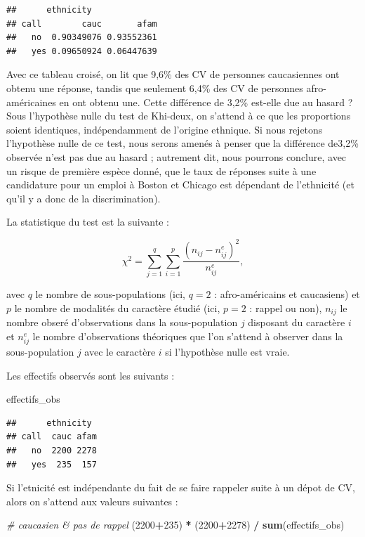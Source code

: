 \documentclass[
  11pt,
]{book}
\newenvironment{Shaded}{\begin{snugshade}}{\end{snugshade}}
\newcommand{\CommentTok}[1]{\textcolor[rgb]{0.56,0.35,0.01}{\textit{#1}}}
\newcommand{\DecValTok}[1]{\textcolor[rgb]{0.00,0.00,0.81}{#1}}
\newcommand{\FunctionTok}[1]{\textcolor[rgb]{0.13,0.29,0.53}{\textbf{#1}}}
\newcommand{\NormalTok}[1]{#1}
\newcommand{\SpecialCharTok}[1]{\textcolor[rgb]{0.81,0.36,0.00}{\textbf{#1}}}
\numberwithin{equation}{section}
\numberwithin{countremarque}{section}
\begin{document}
\begin{lstlisting}
##      ethnicity
## call        cauc       afam
##   no  0.90349076 0.93552361
##   yes 0.09650924 0.06447639
\end{lstlisting}

Avec ce tableau croisé, on lit que 9,6\% des CV de personnes caucasiennes ont obtenu une réponse, tandis que seulement 6,4\% des CV de personnes afro-américaines en ont obtenu une. Cette différence de 3,2\% est-elle due au hasard ? Sous l'hypothèse nulle du test de Khi-deux, on s'attend à ce que les proportions soient identiques, indépendamment de l'origine ethnique. Si nous rejetons l'hypothèse nulle de ce test, nous serons amenés à penser que la différence de3,2\% observée n'est pas due au hasard ; autrement dit, nous pourrons conclure, avec un risque de première espèce donné, que le taux de réponses suite à une candidature pour un emploi à Boston et Chicago est dépendant de l'ethnicité (et qu'il y a donc de la discrimination).

La statistique du test est la suivante :

\[\chi^2 = \sum_{j=1}^{q} \sum_{i=1}^{p} \frac{(n_{ij} - n_{ij}^e)^2}{n_{ij}^e},\]

avec \(q\) le nombre de sous-populations (ici, \(q=2\) : afro-américains et caucasiens) et \(p\) le nombre de modalités du caractère étudié (ici, \(p=2\) : rappel ou non), \(n_{ij}\) le nombre obseré d'observations dans la sous-population \(j\) disposant du caractère \(i\) et \(n_{ij}^e\) le nombre d'observations théoriques que l'on s'attend à observer dans la sous-population \(j\) avec le caractère \(i\) si l'hypothèse nulle est vraie.

Les effectifs observés sont les suivants :

\begin{Shaded}
\begin{Highlighting}[]
\NormalTok{effectifs\_obs}
\end{Highlighting}
\end{Shaded}

\begin{lstlisting}
##      ethnicity
## call  cauc afam
##   no  2200 2278
##   yes  235  157
\end{lstlisting}

Si l'etnicité est indépendante du fait de se faire rappeler suite à un dépot de CV, alors on s'attend aux valeurs suivantes :

\begin{Shaded}
\begin{Highlighting}[]
\CommentTok{\# caucasien \& pas de rappel}
\NormalTok{(}\DecValTok{2200}\SpecialCharTok{+}\DecValTok{235}\NormalTok{) }\SpecialCharTok{*}\NormalTok{ (}\DecValTok{2200}\SpecialCharTok{+}\DecValTok{2278}\NormalTok{) }\SpecialCharTok{/} \FunctionTok{sum}\NormalTok{(effectifs\_obs)}
\end{Highlighting}
\end{Shaded}
\end{document}
